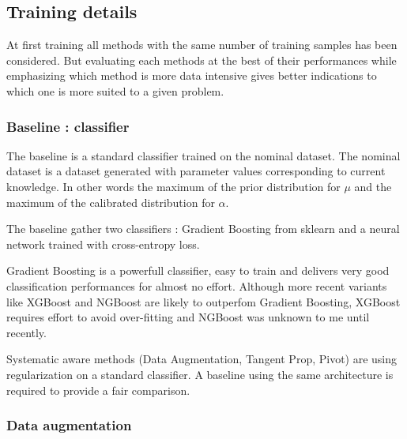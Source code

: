 







\subsection{Training details} %
\label{sub:training_details}


At first training all methods with the same number of training samples has been considered.
But evaluating each methods at the best of their performances while emphasizing which method is more data intensive gives better indications to which one is more suited to a given problem.


\subsubsection{Baseline : classifier} %
\label{ssub:baseline_classifier}

The baseline is a standard classifier trained on the nominal dataset.
The nominal dataset is a dataset generated with parameter values corresponding to current knowledge.
In other words the maximum of the prior distribution for $\mu$ and the maximum of the calibrated distribution for $\alpha$.

The baseline gather two classifiers : Gradient Boosting from sklearn \needcite and a neural network trained with cross-entropy loss.

Gradient Boosting is a powerfull classifier, easy to train and delivers very good classification performances for almost no effort.
Although more recent variants like XGBoost \needcite and NGBoost \needcite are likely to outperfom Gradient Boosting, XGBoost requires effort to avoid over-fitting and NGBoost was unknown to me until recently.

Systematic aware methods (Data Augmentation, Tangent Prop, Pivot) are using regularization on a standard classifier.
A baseline using the same architecture is required to provide a fair comparison.




\subsubsection{Data augmentation} %
\label{ssub:data_augmentation}


